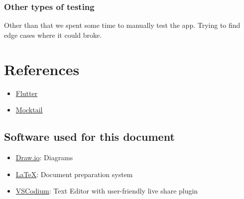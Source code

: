 \documentclass{article}
\begin{document}
\subsubsection{Other types of testing}
Other than that we spent some time to manually test the app. Trying to find edge cases where it could broke.

\newpage
\section{References}
\begin{itemize}
	\item \href{https://flutter.dev/}{Flutter}
	\item \href{https://github.com/felangel/mocktail/tree/main/packages/mocktail/}{Mocktail}
\end{itemize}
\subsection{Software used for this document}
\begin{itemize}
	\item \href{https://www.draw.io/}{Draw.io}: Diagrams
	\item \href{https://www.latex-project.org/}{LaTeX}: Document preparation system 
	\item \href{https://vscodium.com/}{VSCodium}: Text Editor with user-friendly live share plugin
\end{itemize} 
\end{document}

